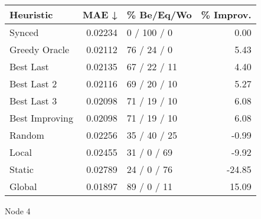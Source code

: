 \begin{tabular}{lrlr}
\toprule
\textbf{Heuristic} & \textbf{MAE ↓} & \textbf{\% Be/Eq/Wo} & \textbf{\% Improv.} \\
\midrule
            Synced &        0.02234 &          0 / 100 / 0 &                0.00 \\
     Greedy Oracle &        0.02112 &          76 / 24 / 0 &                5.43 \\
         Best Last &        0.02135 &         67 / 22 / 11 &                4.40 \\
       Best Last 2 &        0.02116 &         69 / 20 / 10 &                5.27 \\
       Best Last 3 &        0.02098 &         71 / 19 / 10 &                6.08 \\
    Best Improving &        0.02098 &         71 / 19 / 10 &                6.08 \\
            Random &        0.02256 &         35 / 40 / 25 &               -0.99 \\
             Local &        0.02455 &          31 / 0 / 69 &               -9.92 \\
            Static &        0.02789 &          24 / 0 / 76 &              -24.85 \\
            Global &        0.01897 &          89 / 0 / 11 &               15.09 \\
\bottomrule
\end{tabular}
\caption{Node 4}
\label{tab:iid_lr05_le2_bs4_4}
